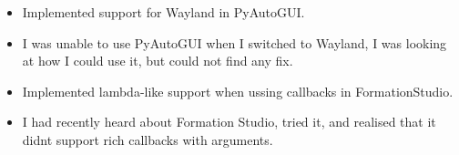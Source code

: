 \documentclass[10pt,a4paper,withhyper]{altacv}
\begin{document}
\begin{paracol}{2}
\medskip













\begin{itemize}
\item Implemented support for Wayland in PyAutoGUI.
\item I was unable to use PyAutoGUI when I switched to Wayland, I was looking at how I could use it, but could not find any fix.
\end{itemize}

\begin{itemize}
\item Implemented lambda-like support when ussing callbacks in FormationStudio.
\item I had recently heard about Formation Studio, tried it, and realised that it didnt support rich callbacks with arguments.
\end{itemize}


\end{paracol}
\end{document}

